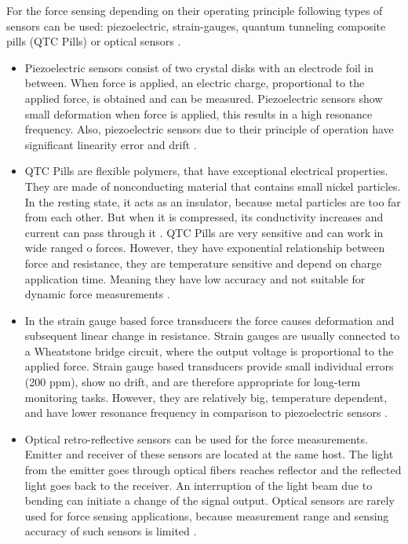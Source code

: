 For the force sensing depending on their operating principle following types of sensors can be used: piezoelectric, strain-gauges, quantum tunneling composite pills (QTC Pills) or optical sensors \cite{SGandP1}.

\begin{itemize}
\item Piezoelectric sensors consist of two crystal disks with an electrode foil in between. When force is applied, an electric charge, proportional to the applied force, is obtained and can be measured. Piezoelectric sensors show small deformation when force is applied, this results in a high resonance frequency. Also, piezoelectric sensors due to their principle of operation have significant linearity error and drift \cite{SGandP2}.

\item QTC Pills are flexible polymers, that have exceptional electrical properties. They are made of nonconducting material that contains small nickel particles.  In the resting state, it acts as an insulator, because metal particles are too far from each other. But when it is compressed, its conductivity increases and current can pass through it \cite{azaman_characteristic_2016}. QTC Pills are very sensitive and can work in wide ranged o forces. However, they have exponential relationship between force and resistance, they are temperature sensitive and depend on charge application time. Meaning they have low accuracy and not suitable for dynamic force measurements \cite{_quantum_2010}.

\item In the strain gauge based force transducers the force causes deformation and subsequent linear change in resistance. Strain gauges are usually connected to a Wheatstone bridge circuit, where the output voltage is proportional to the applied force. Strain gauge based transducers provide small individual errors (200 ppm), show no drift, and are therefore appropriate for long-term monitoring tasks. However, they are relatively big, temperature dependent, and have lower resonance frequency in comparison to piezoelectric sensors \cite{SGandP1,SGandP2}.

\item Optical retro-reflective sensors can be used for the force measurements. Emitter and receiver of these sensors are located at the same host. The light from the emitter goes through optical fibers reaches reflector and the reflected light goes back to the receiver. An interruption of the light beam due to bending can initiate a change of the signal output. Optical sensors are rarely used for force sensing applications, because measurement range and sensing accuracy of such sensors is limited \cite{su_fiber_optic_2017}.
\end{itemize}


